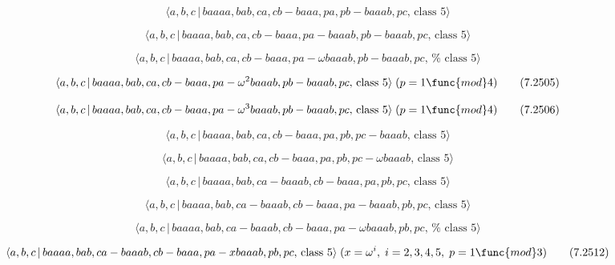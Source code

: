 \documentclass[10pt]{article}
\begin{document}
\begin{equation}
\langle a,b,c\,|\,baaaa,bab,ca,cb-baaa,pa,pb-baaab,pc,\,\text{class }5\rangle
\tag{7.2502}
\end{equation}

\begin{equation}
\langle a,b,c\,|\,baaaa,bab,ca,cb-baaa,pa-baaab,pb-baaab,pc,\,\text{class }%
5\rangle  \tag{7.2503}
\end{equation}

\begin{equation}
\langle a,b,c\,|\,baaaa,bab,ca,cb-baaa,pa-\omega baaab,pb-baaab,pc,\,\text{%
class }5\rangle  \tag{7.2504}
\end{equation}

\begin{equation}
\langle a,b,c\,|\,baaaa,bab,ca,cb-baaa,pa-\omega ^{2}baaab,pb-baaab,pc,\,%
\text{class }5\rangle \;(p=1\func{mod}4)  \tag{7.2505}
\end{equation}

\begin{equation}
\langle a,b,c\,|\,baaaa,bab,ca,cb-baaa,pa-\omega ^{3}baaab,pb-baaab,pc,\,%
\text{class }5\rangle \;(p=1\func{mod}4)  \tag{7.2506}
\end{equation}

\begin{equation}
\langle a,b,c\,|\,baaaa,bab,ca,cb-baaa,pa,pb,pc-baaab,\,\text{class }5\rangle
\tag{7.2507}
\end{equation}

\begin{equation}
\langle a,b,c\,|\,baaaa,bab,ca,cb-baaa,pa,pb,pc-\omega baaab,\,\text{class }%
5\rangle  \tag{7.2508}
\end{equation}

\begin{equation}
\langle a,b,c\,|\,baaaa,bab,ca-baaab,cb-baaa,pa,pb,pc,\,\text{class }5\rangle
\tag{7.2509}
\end{equation}

\begin{equation}
\langle a,b,c\,|\,baaaa,bab,ca-baaab,cb-baaa,pa-baaab,pb,pc,\,\text{class }%
5\rangle  \tag{7.2510}
\end{equation}

\begin{equation}
\langle a,b,c\,|\,baaaa,bab,ca-baaab,cb-baaa,pa-\omega baaab,pb,pc,\,\text{%
class }5\rangle  \tag{7.2511}
\end{equation}

\begin{equation}
\langle a,b,c\,|\,baaaa,bab,ca-baaab,cb-baaa,pa-xbaaab,pb,pc,\,\text{class }%
5\rangle \;(x=\omega ^{i},\;i=2,3,4,5,\;p=1\func{mod}3)  \tag{7.2512}
\end{equation}
\end{document}
